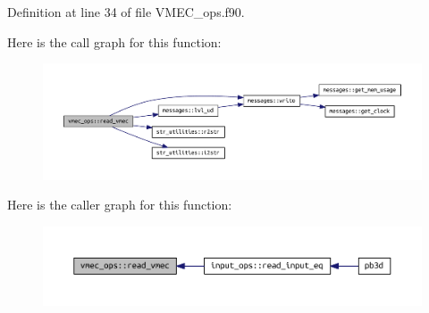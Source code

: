 Definition at line 34 of file V\+M\+E\+C\+\_\+ops.\+f90.

Here is the call graph for this function\+:
\nopagebreak
\begin{figure}[H]
\begin{center}
\leavevmode
\includegraphics[width=350pt]{namespacevmec__ops_a5afb9dedf9ef3dc2b4d93e20de2e22b8_cgraph}
\end{center}
\end{figure}
Here is the caller graph for this function\+:
\nopagebreak
\begin{figure}[H]
\begin{center}
\leavevmode
\includegraphics[width=350pt]{namespacevmec__ops_a5afb9dedf9ef3dc2b4d93e20de2e22b8_icgraph}
\end{center}
\end{figure}
